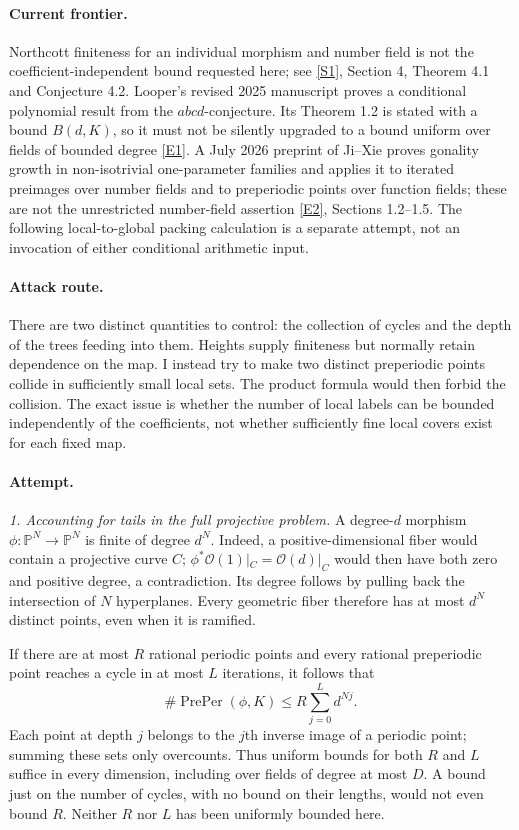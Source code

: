\documentclass[11pt,a4paper]{article}
\newcommand{\PP}{\mathbb P}
\newcommand{\sref}[2]{\hyperlink{source:#1:#2}{[S#2]}}
\newcommand{\eref}[2]{\hyperlink{extra:#1:#2}{[E#2]}}
\begin{document}
\paragraph{Current frontier.}
Northcott finiteness for an individual morphism and number field is not the
coefficient-independent bound requested here; see \sref{statement}{1}, Section 4,
Theorem 4.1 and Conjecture 4.2. Looper's revised 2025 manuscript proves a
conditional polynomial result from the $abcd$-conjecture. Its Theorem 1.2 is
stated with a bound $B(d,K)$, so it must not be silently upgraded to a bound
uniform over fields of bounded degree \eref{statement}{1}. A July 2026 preprint of
Ji--Xie proves gonality growth in non-isotrivial one-parameter families and
applies it to iterated preimages over number fields and to preperiodic points
over function fields; these are not the unrestricted number-field assertion
\eref{statement}{2}, Sections 1.2--1.5. The following local-to-global packing
calculation is a separate attempt, not an invocation of either conditional
arithmetic input.

\paragraph{Attack route.}
There are two distinct quantities to control: the collection of cycles and
the depth of the trees feeding into them. Heights supply finiteness but
normally retain dependence on the map. I instead try to make two distinct
preperiodic points collide in sufficiently small local sets. The product
formula would then forbid the collision. The exact issue is whether the
number of local labels can be bounded independently of the coefficients,
not whether sufficiently fine local covers exist for each fixed map.

\paragraph{Attempt.}
\textit{1. Accounting for tails in the full projective problem.}
A degree-$d$ morphism $\phi:\PP^N\to\PP^N$ is finite of degree $d^N$.
Indeed, a positive-dimensional fiber would contain a projective curve $C$;
$\phi^*\mathcal O(1)|_C=\mathcal O(d)|_C$ would then have both zero and
positive degree, a contradiction. Its degree follows by pulling back the
intersection of $N$ hyperplanes. Every geometric fiber therefore has at most
$d^N$ distinct points, even when it is ramified.

If there are at most $R$ rational periodic points and every rational
preperiodic point reaches a cycle in at most $L$ iterations, it follows that
\[
 \#\operatorname{PrePer}(\phi,K)
 \le R\sum_{j=0}^{L}d^{Nj}.                                    \tag{212.1}
\]
Each point at depth $j$ belongs to the $j$th inverse image of a periodic
point; summing these sets only overcounts. Thus uniform bounds for both
$R$ and $L$ suffice in every dimension, including over fields of degree at
most $D$. A bound just on the number of cycles, with no bound on their
lengths, would not even bound $R$. Neither $R$ nor $L$ has been uniformly
bounded here.
\end{document}
